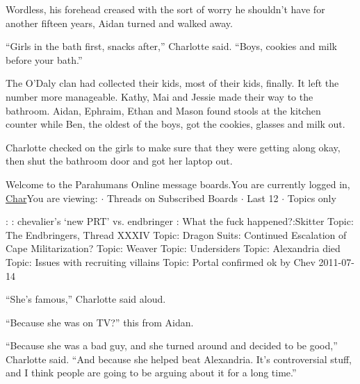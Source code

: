 Wordless, his forehead creased with the sort of worry he shouldn't have for another fifteen years, Aidan turned and walked away.



``Girls in the bath first, snacks after,'' Charlotte said.  ``Boys, cookies and milk before your bath.''



The O'Daly clan had collected their kids, most of their kids, finally.  It left the number more manageable.  Kathy, Mai and Jessie made their way to the bathroom.  Aidan, Ephraim, Ethan and Mason found stools at the kitchen counter while Ben, the oldest of the boys, got the cookies, glasses and milk out.



Charlotte checked on the girls to make sure that they were getting along okay, then shut the bathroom door and got her laptop out.



Welcome to the Parahumans Online message boards.You are currently logged in, \underline{Char}You are viewing:
$\cdot$  Threads on Subscribed Boards
$\cdot$  Last 12
$\cdot$  Topics only



\blacklozenge  {}
\blacklozenge  {}:  
\blacklozenge  {}:  chevalier's `new PRT' vs. endbringer
\blacklozenge  {}:  What the fuck happened?\blacklozenge  {}:\strong{  }Skitter
\blacklozenge  Topic:  The Endbringers, Thread XXXIV
\blacklozenge  Topic:  Dragon Suits: Continued Escalation of Cape Militarization?
\blacklozenge  Topic:  Weaver
\blacklozenge  Topic:  Undersiders
\blacklozenge  Topic:  Alexandria died
\blacklozenge  Topic:  Issues with recruiting villains
\blacklozenge  Topic:  Portal confirmed ok by Chev 2011-07-14



``She's famous,'' Charlotte said aloud.



``Because she was on TV?'' this from Aidan.



``Because she was a bad guy, and she turned around and decided to be good,'' Charlotte said.  ``And because she helped beat Alexandria.  It's controversial stuff, and I think people are going to be arguing about it for a long time.''



